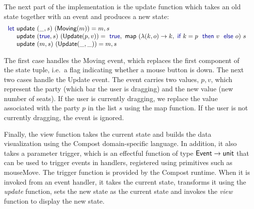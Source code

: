 \documentclass{jfp}
\newcommand{\ident}[1]{\textnormal{\textcolor{idclr}{\sffamily #1}}}
\newcommand{\kvd}[1]{\textnormal{\textcolor{kvdclr}{\sffamily #1}}}
\newcommand{\fkvd}[1]{\textnormal{\textcolor{fkvdclr}{\sffamily #1}}}
\begin{document}
The next part of the implementation is the \ident{update} function which takes an old state together
with an event and produces a new state:
%
\begin{equation*}
\begin{array}{l}
\fkvd{let}~\ident{update}~(\_,s)~(\ident{Moving}(m)) = m,s\\
\hspace{1.05em}~\ident{update}~(\fkvd{true},s)~(\ident{Update}(p, v)) =
  \fkvd{true}, \ident{map}~(\lambda(k, o) \rightarrow k, \fkvd{if}~k = p~\fkvd{then}~v~\fkvd{else}~o)~s\\
\hspace{1.05em}~\ident{update}~(m,s)~(\ident{Update}(\_, \_)) = m,s\\
\end{array}
\end{equation*}

\vspace{-0.5em}
\noindent
The first case handles the \ident{Moving} event, which replaces the first component of the
state tuple, i.e.~a flag indicating whether a mouse button is down.
The next two cases handle the \ident{Update} event. The event carries two values, $p, v$, which
represent the party (which bar the user is dragging) and the new value (new number of seats).
If the user is currently dragging, we replace the value associated with the party $p$ in \noindent the
list $s$ using the \ident{map} function. If the user is not currently dragging, the event is ignored.

Finally, the \ident{view} function takes the current state and builds the data visualization
using the Compost domain-specific language. In addition, it also takes a parameter \ident{trigger},
which is an effectful function of type $\ident{Event}\rightarrow\ident{unit}$ that can be used to
trigger events in handlers, registered using primitives such as \kvd{mouseMove}. The \ident{trigger}
function is provided by the Compost runtime. When it is invoked from an event handler, it takes
the current state, transforms it using the \emph{update} function, sets the new state as the
current state and invokes the \emph{view} function to display the new state.
\end{document}
